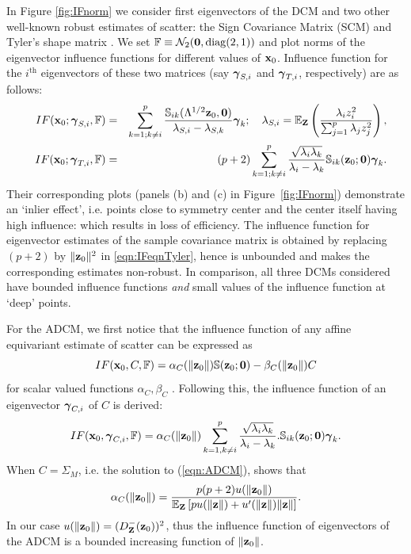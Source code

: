 In Figure \ref{fig:IFnorm} we consider first eigenvectors of the DCM and two other well-known robust estimates of scatter: the Sign Covariance Matrix (SCM) and Tyler's shape matrix \citep{tyler87}. We set ${\mathbb{F}} \equiv \mathcal{N}_2({\bf 0}, \operatorname*{diag}(2,1))$ and plot norms of the eigenvector influence functions for different values of ${\bf{x}}_0$. Influence function for the $i^\text{th}$ eigenvectors of these two matrices (say ${\boldsymbol{\gamma}}_{S,i}$ and ${\boldsymbol{\gamma}}_{T,i}$, respectively) are as follows:
%
\begin{eqnarray}
\quad IF({\bf{x}}_0; {\boldsymbol{\gamma}}_{S,i}, {\mathbb{F}}) &=&
\sum_{k=1; k \neq i}^p \frac{{\mathbb{S}}_{ik}(\Lambda^{1/2} {\bf{z}}_0, {\bf 0})}{\lambda_{S,i} - \lambda_{S,k}} {\boldsymbol{\gamma}}_k; \quad
\lambda_{S,i} = {\mathbb{E}}_{\mathbf{Z}} \left( \frac{\lambda_i z_i^2}{\sum_{j=1}^p \lambda_j z_j^2} \right),\\
IF({\bf{x}}_0; {\boldsymbol{\gamma}}_{T,i}, {\mathbb{F}}) &=& (p+2) \sum_{k=1; k \neq i}^p \frac{\sqrt{\lambda_i \lambda_k}}{\lambda_i - \lambda_k}{\mathbb{S}}_{ik}({\bf{z}}_0; {\bf 0}) {\boldsymbol{\gamma}}_k. \label{eqn:IFeqnTyler}
\end{eqnarray}
%
Their corresponding plots (panels (b) and (c) in Figure~\ref{fig:IFnorm}) demonstrate an `inlier effect', i.e. points close to symmetry center and the center itself having high influence: which results in loss of efficiency. The influence function for eigenvector estimates of the sample covariance matrix is obtained by replacing $(p+2)$ by $\| {\bf{z}}_0 \|^2$ in \eqref{eqn:IFeqnTyler}, hence is unbounded and makes the corresponding estimates non-robust. In comparison, all three DCMs considered have bounded influence functions {\it and} small values of the influence function at `deep' points.

For the ADCM, we first notice that the influence function of any affine equivariant estimate of scatter can be expressed as
%
$$
IF({\bf{x}}_0, C, {\mathbb{F}}) = \alpha_C (\| {\bf{z}}_0 \| ) {\mathbb{S}}({\bf{z}}_0; {\bf 0}) - \beta_C( \| {\bf{z}}_0 \| ) C
$$
%
for scalar valued functions $\alpha_C, \beta_C$ \citep{HampelBook86}. Following this, the influence function of an eigenvector ${\boldsymbol{\gamma}}_{C,i}$ of $C$ is derived:
%
$$
IF({\bf{x}}_0, {\boldsymbol{\gamma}}_{C,i}, {\mathbb{F}}) = \alpha_C(\| {\bf{z}}_0 \|) \sum_{k=1, k \neq i}^p \frac{\sqrt {\lambda_i \lambda_k}}{\lambda_i - \lambda_k}. {\mathbb{S}}_{ik}({\bf{z}}_0; {\bf 0}) {\boldsymbol{\gamma}}_k.
$$
%
When $C=\Sigma_M$, i.e. the solution to (\ref{eqn:ADCM}), \cite{HuberBook81} shows that
%
$$
\alpha_C (\| {\bf{z}}_0 \|) = \frac{p(p+2) u (\| {\bf{z}}_0 \|)}{{\mathbb{E}}_{{\mathbf{Z}}} \left[ p u(\| {\bf{z}} \| ) + u'(\| {\bf{z}} \|) \| {\bf{z}} \| \right] }.
$$
%
In our case $u( \| {\bf{z}}_0 \|) = ( D^-_{\mathbf{Z}} ({\bf{z}}_0))^2$, thus the influence function of eigenvectors of the ADCM is a bounded increasing function of $\| {\bf{z}}_0 \|$.

